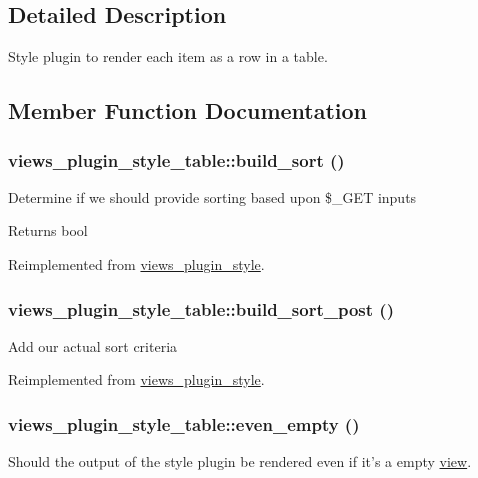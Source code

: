 \subsection{Detailed Description}
Style plugin to render each item as a row in a table. 

\subsection{Member Function Documentation}
\hypertarget{classviews__plugin__style__table_a3bc31ba52d980f899307aee2d74bef58}{
\subsubsection[{build\_\-sort}]{\setlength{\rightskip}{0pt plus 5cm}views\_\-plugin\_\-style\_\-table::build\_\-sort ()}}
\label{classviews__plugin__style__table_a3bc31ba52d980f899307aee2d74bef58}
Determine if we should provide sorting based upon \$\_\-GET inputs

\begin{DoxyReturn}{Returns}
bool 
\end{DoxyReturn}


Reimplemented from \hyperlink{classviews__plugin__style_a13b4b43f813fde038a199d2ec26fc76e}{views\_\-plugin\_\-style}.\hypertarget{classviews__plugin__style__table_a00d9e14ac7f545d47a43af3f9d186382}{
\subsubsection[{build\_\-sort\_\-post}]{\setlength{\rightskip}{0pt plus 5cm}views\_\-plugin\_\-style\_\-table::build\_\-sort\_\-post ()}}
\label{classviews__plugin__style__table_a00d9e14ac7f545d47a43af3f9d186382}
Add our actual sort criteria 

Reimplemented from \hyperlink{classviews__plugin__style_af59de962f895ccd0b3adf960b908e0bd}{views\_\-plugin\_\-style}.\hypertarget{classviews__plugin__style__table_a6c1b6a4ddba95e72a3cc2dee0af9b92c}{
\subsubsection[{even\_\-empty}]{\setlength{\rightskip}{0pt plus 5cm}views\_\-plugin\_\-style\_\-table::even\_\-empty ()}}
\label{classviews__plugin__style__table_a6c1b6a4ddba95e72a3cc2dee0af9b92c}
Should the output of the style plugin be rendered even if it's a empty \hyperlink{classview}{view}. 

